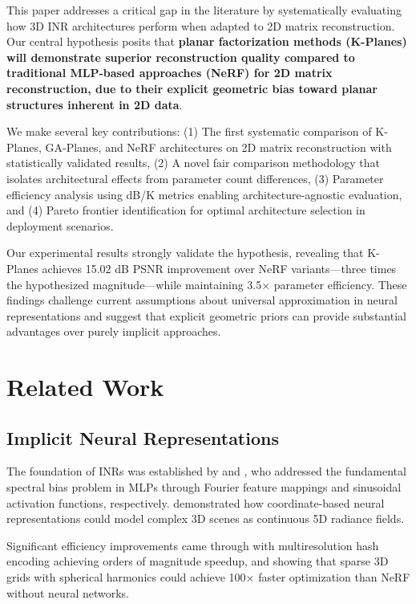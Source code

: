\documentclass{article}
\begin{document}
This paper addresses a critical gap in the literature by systematically evaluating how 3D INR architectures perform when adapted to 2D matrix reconstruction. Our central hypothesis posits that \textbf{planar factorization methods (K-Planes) will demonstrate superior reconstruction quality compared to traditional MLP-based approaches (NeRF) for 2D matrix reconstruction, due to their explicit geometric bias toward planar structures inherent in 2D data}.

We make several key contributions: (1) The first systematic comparison of K-Planes, GA-Planes, and NeRF architectures on 2D matrix reconstruction with statistically validated results, (2) A novel fair comparison methodology that isolates architectural effects from parameter count differences, (3) Parameter efficiency analysis using dB/K metrics enabling architecture-agnostic evaluation, and (4) Pareto frontier identification for optimal architecture selection in deployment scenarios.

Our experimental results strongly validate the hypothesis, revealing that K-Planes achieves 15.02 dB PSNR improvement over NeRF variants—three times the hypothesized magnitude—while maintaining 3.5× parameter efficiency. These findings challenge current assumptions about universal approximation in neural representations and suggest that explicit geometric priors can provide substantial advantages over purely implicit approaches.

\section{Related Work}

\subsection{Implicit Neural Representations}

The foundation of INRs was established by \citet{tancik2020fourier} and \citet{sitzmann2020siren}, who addressed the fundamental spectral bias problem in MLPs through Fourier feature mappings and sinusoidal activation functions, respectively. \citet{mildenhall2020nerf} demonstrated how coordinate-based neural representations could model complex 3D scenes as continuous 5D radiance fields.

Significant efficiency improvements came through \citet{mueller2022instant} with multiresolution hash encoding achieving orders of magnitude speedup, and \citet{yu2022plenoxels} showing that sparse 3D grids with spherical harmonics could achieve 100× faster optimization than NeRF without neural networks.
\end{document}
